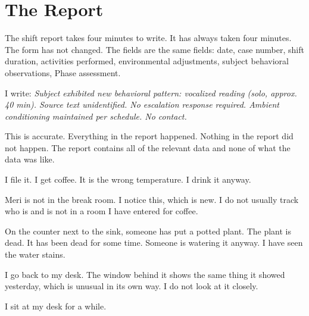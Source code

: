 
\chapter{The Report}

The shift report takes four minutes to write. It has always taken four minutes. The form has not changed. The fields are the same fields: date, case number, shift duration, activities performed, environmental adjustments, subject behavioral observations, Phase assessment.

I write: \emph{Subject exhibited new behavioral pattern: vocalized reading (solo, approx. 40 min). Source text unidentified. No escalation response required. Ambient conditioning maintained per schedule. No contact.}

This is accurate. Everything in the report happened. Nothing in the report did not happen. The report contains all of the relevant data and none of what the data was like.

I file it. I get coffee. It is the wrong temperature. I drink it anyway.

Meri is not in the break room. I notice this, which is new. I do not usually track who is and is not in a room I have entered for coffee.

On the counter next to the sink, someone has put a potted plant. The plant is dead. It has been dead for some time. Someone is watering it anyway. I have seen the water stains.

I go back to my desk. The window behind it shows the same thing it showed yesterday, which is unusual in its own way. I do not look at it closely.

I sit at my desk for a while.
